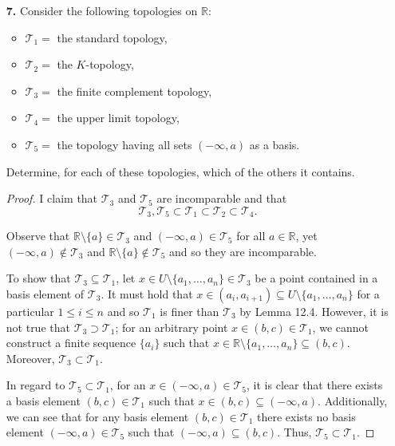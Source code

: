 \documentclass[ 12pt ]{article}
\begin{document}
\begin{enumerate}
	\item[\textbf{7.}] Consider the following topologies on $\mathbb{R}$:
		\begin{itemize}
			\item $\mathcal{T}_1 = $ the standard topology,
			\item $\mathcal{T}_2 = $ the $K$-topology,
			\item $\mathcal{T}_3 = $ the finite complement topology,
			\item $\mathcal{T}_4 = $ the upper limit topology,
			\item $\mathcal{T}_5 = $ the topology having all sets $(-\infty, a)$ as a basis.
		\end{itemize}
		Determine, for each of these topologies, which of the others it contains.

		\begin{proof}
			I claim that $\mathcal{T}_3$ and $\mathcal{T}_5$ are incomparable and that $$\mathcal{T}_3, \mathcal{T}_5 \subset \mathcal{T}_1 \subset \mathcal{T}_2 \subset \mathcal{T}_4.$$

			Observe that $\mathbb{R} \setminus \{a\} \in \mathcal{T}_3$ and $(-\infty, a) \in \mathcal{T}_5$ for all $a \in \mathbb{R}$, yet $(-\infty, a) \notin \mathcal{T}_3$
			and $\mathbb{R} \setminus \{a\} \notin \mathcal{T}_5$ and so they are incomparable.

			To show that $\mathcal{T}_3 \subseteq \mathcal{T}_1$, let $x \in U \setminus \{a_1, \hdots, a_n\} \in \mathcal{T}_3$ be a point contained in a basis element of
			$\mathcal{T}_3$. It must hold that $x \in (a_i,  a_{i+1}) \subseteq U \setminus \{a_1, \hdots, a_n\}$ for a particular $1 \leq i \leq n$ and so $\mathcal{T}_1$ is finer than
			$\mathcal{T}_3$ by Lemma 12.4. However, it is not true that $\mathcal{T}_3 \supset \mathcal{T}_1$; for an arbitrary point $x \in (b, c) \in \mathcal{T}_1$, we cannot construct
			a finite sequence $\{a_i\}$ such that $x \in \mathbb{R} \setminus \{a_1, \hdots, a_n\} \subseteq (b, c)$. Moreover, $\mathcal{T}_3 \subset \mathcal{T}_1$.

			In regard to $\mathcal{T}_5 \subset \mathcal{T}_1$, for an $x \in (-\infty, a) \in \mathcal{T}_5$, it is clear that there exists a basis element $(b, c) \in \mathcal{T}_1$
			such that $x \in (b, c) \subseteq (-\infty, a)$. Additionally, we can see that for any basis element $(b, c) \in \mathcal{T}_1$ there exists no basis element $(-\infty,
			a) \in \mathcal{T}_5$ such that $(-\infty, a) \subseteq (b, c)$. Thus, $\mathcal{T}_5 \subset \mathcal{T}_1$.


\end{proof}
\end{enumerate}
\end{document}
